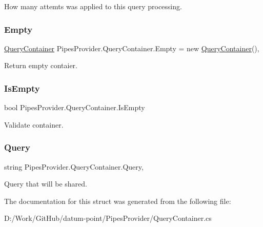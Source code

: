 How many attemts was applied to this query processing. 

\mbox{\label{struct_pipes_provider_1_1_query_container_a3daff9827ee4f77286eb4385a64e2fe2}} 
\subsubsection{\texorpdfstring{Empty}{Empty}}
{\footnotesize\ttfamily \mbox{\hyperlink{struct_pipes_provider_1_1_query_container}{Query\+Container}} Pipes\+Provider.\+Query\+Container.\+Empty = new \mbox{\hyperlink{struct_pipes_provider_1_1_query_container}{Query\+Container}}()\hspace{0.3cm}{\ttfamily [static]}, {\ttfamily [get]}}



Return empty contaier. 

\mbox{\label{struct_pipes_provider_1_1_query_container_a3449e3e35c97dd80bd2f8076160633fa}} 
\subsubsection{\texorpdfstring{Is\+Empty}{IsEmpty}}
{\footnotesize\ttfamily bool Pipes\+Provider.\+Query\+Container.\+Is\+Empty\hspace{0.3cm}{\ttfamily [get]}}



Validate container. 

\mbox{\label{struct_pipes_provider_1_1_query_container_a6d66f084a62271934e708750d4c4dafa}} 
\subsubsection{\texorpdfstring{Query}{Query}}
{\footnotesize\ttfamily string Pipes\+Provider.\+Query\+Container.\+Query\hspace{0.3cm}{\ttfamily [get]}, {\ttfamily [set]}}



Query that will be shared. 



The documentation for this struct was generated from the following file\+:\begin{DoxyCompactItemize}
\item 
D\+:/\+Work/\+Git\+Hub/datum-\/point/\+Pipes\+Provider/Query\+Container.\+cs\end{DoxyCompactItemize}
